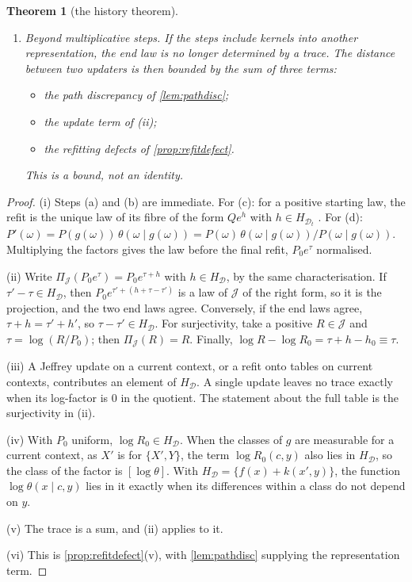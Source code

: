 \documentclass[11pt]{article}
\newtheorem{theorem}{Theorem}\newtheorem{proposition}[theorem]{Proposition}\newtheorem{lemma}[theorem]{Lemma}\newtheorem{corollary}[theorem]{Corollary}\newtheorem{conjecture}[theorem]{Conjecture}\crefname{conjecture}{Conjecture}{Conjectures}
\theoremstyle{definition}\newtheorem{definition}[theorem]{Definition}\newtheorem{remark}[theorem]{Remark}\newtheorem{example}[theorem]{Example}\newtheorem{problem}[theorem]{Open problem}\crefname{problem}{Problem}{Problems}
\begin{document}
\begin{theorem}[the history theorem]
\begin{enumerate}
\[
[\tau]\in\Big(H_{\mathcal D}+\sum_{C\in\mathcal C}F_C\Big)\Big/H_{\mathcal D},
\]
where $F_C$ is the space of functions of $x_C$. Attribution is therefore to sets of contexts, and only up to that span.
\item[(vi)] \emph{Beyond multiplicative steps.} If the steps include kernels into another representation, the end law is no longer determined by a trace. The distance between two updaters is then bounded by the sum of three terms:
\begin{itemize}
\item the path discrepancy of \cref{lem:pathdisc};
\item the update term of (ii);
\item the refitting defects of \cref{prop:refitdefect}.
\end{itemize}
This is a bound, not an identity.
\end{enumerate}
\end{theorem}

\begin{proof}
(i) Steps (a) and (b) are immediate. For (c): for a positive starting law, the refit is the unique law of its fibre of the form $Qe^{h}$ with $h\in H_{\mathcal D_t}$ \cite{Csiszar1975}. For (d): $P'(\omega)=P(g(\omega))\,\theta(\omega\mid g(\omega))=P(\omega)\,\theta(\omega\mid g(\omega))/P(\omega\mid g(\omega))$. Multiplying the factors gives the law before the final refit, $P_0e^\tau$ normalised.

(ii) Write $\Pi_{\mathcal J}(P_0e^{\tau})=P_0e^{\tau+h}$ with $h\in H_{\mathcal D}$, by the same characterisation. If $\tau'-\tau\in H_{\mathcal D}$, then $P_0e^{\tau'+(h+\tau-\tau')}$ is a law of $\mathcal J$ of the right form, so it is the projection, and the two end laws agree. Conversely, if the end laws agree, $\tau+h=\tau'+h'$, so $\tau-\tau'\in H_{\mathcal D}$. For surjectivity, take a positive $R\in\mathcal J$ and $\tau=\log(R/P_0)$; then $\Pi_{\mathcal J}(R)=R$. Finally, $\log R-\log R_0=\tau+h-h_0\equiv\tau$.

(iii) A Jeffrey update on a current context, or a refit onto tables on current contexts, contributes an element of $H_{\mathcal D}$. A single update leaves no trace exactly when its log-factor is $0$ in the quotient. The statement about the full table is the surjectivity in (ii).

(iv) With $P_0$ uniform, $\log R_0\in H_{\mathcal D}$. When the classes of $g$ are measurable for a current context, as $X'$ is for $\{X',Y\}$, the term $\log R_0(c,y)$ also lies in $H_{\mathcal D}$, so the class of the factor is $[\log\theta]$. With $H_{\mathcal D}=\{f(x)+k(x',y)\}$, the function $\log\theta(x\mid c,y)$ lies in it exactly when its differences within a class do not depend on $y$.

(v) The trace is a sum, and (ii) applies to it.

(vi) This is \cref{prop:refitdefect}(v), with \cref{lem:pathdisc} supplying the representation term.
\end{proof}
\end{document}

